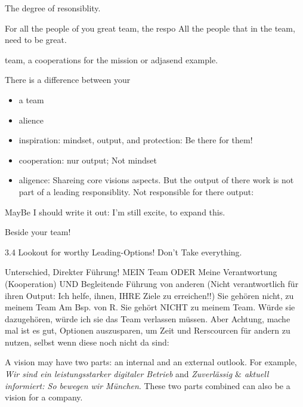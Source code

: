 The degree of resonsiblity.

For all the people of you great team, the respo
All the people that in the team, need to be great.

 team, a cooperations for the mission or adjasend example.

There is a difference between your 
\begin{itemize}
	\item a team
	\item alience %
	\item inspiration: mindset, output, and protection: Be there for them!
	\item cooperation: nur output; Not mindset
	\item aligence: Shareing core visions aspects. But the output of there work is not part of a leading responsiblity.
	 Not responsible for there output:
\end{itemize}
MayBe I should write it out: I'm still excite, to expand this.

Beside your team!


3.4 Lookout for worthy Leading-Options! Don’t Take everything.

Unterschied, 
Direkter Führung! 
MEIN Team 
ODER Meine Verantwortung (Kooperation)
UND Begleitende Führung von anderen (Nicht verantwortlich für ihren Output: Ich helfe, ihnen, IHRE Ziele zu erreichen!!) Sie gehören nicht, zu meinem Team Am Bsp. von R. Sie gehört NICHT zu meinem Team. Würde sie dazugehören, würde ich sie das Team verlassen müssen.
Aber Achtung, mache mal ist es gut, Optionen auszusparen, um Zeit und Rerscourcen für andern zu nutzen, selbst wenn diese noch nicht da sind:

A vision may have two parts: an internal and an external outlook. For example, \textit{Wir sind ein leistungsstarker digitaler Betrieb} and \textit{Zuverlässig $\&$ aktuell informiert: So bewegen wir München}. These two parts combined can also be a vision for a company.\\
